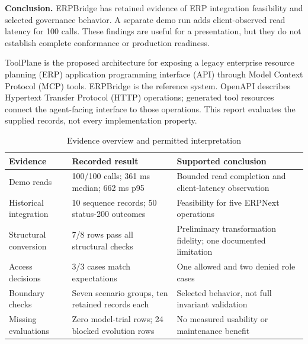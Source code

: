 \textbf{Conclusion.} ERPBridge has retained evidence of ERP integration feasibility and selected governance behavior. A separate demo run adds client-observed read latency for 100 calls. These findings are useful for a presentation, but they do not establish complete conformance or production readiness.

ToolPlane is the proposed architecture for exposing a legacy enterprise resource planning (ERP) application programming interface (API) through Model Context Protocol (MCP) tools. ERPBridge is the reference system. OpenAPI describes Hypertext Transfer Protocol (HTTP) operations; generated tool resources connect the agent-facing interface to those operations. This report evaluates the supplied records, not every implementation property.

\begin{table}[h]\caption{Evidence overview and permitted interpretation}\EvidenceTableStart
\begin{tabularx}{\linewidth}{@{}P{28mm}P{38mm}X@{}}\toprule
Evidence & Recorded result & Supported conclusion\\\midrule
Demo reads & 100/100 calls; 361 ms median; 662 ms p95 & Bounded read completion and client-latency observation\\
Historical integration & 10 sequence records; 50 status-200 outcomes & Feasibility for five ERPNext operations\\
Structural conversion & 7/8 rows pass all structural checks & Preliminary transformation fidelity; one documented limitation\\
Access decisions & 3/3 cases match expectations & One allowed and two denied role cases\\
Boundary checks & Seven scenario groups, ten retained records each & Selected behavior, not full invariant validation\\
Missing evaluations & Zero model-trial rows; 24 blocked evolution rows & No measured usability or maintenance benefit\\\bottomrule
\end{tabularx}\end{table}


